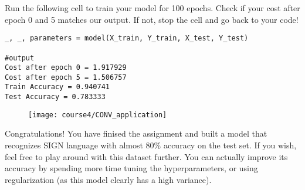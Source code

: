 Run the following cell to train your model for 100 epochs. Check if your cost after epoch 0 and 5 matches our output. If not, stop the cell and go back to your code!

\begin{verbatim}
_, _, parameters = model(X_train, Y_train, X_test, Y_test)

#output
Cost after epoch 0 = 1.917929
Cost after epoch 5 = 1.506757
Train Accuracy = 0.940741
Test Accuracy = 0.783333
\end{verbatim}
\clearpage
\begin{figure}[h]
\begin{center}
\texttt{[image: course4/CONV\_application]}
\end{center}
\end{figure}

Congratulations! You have finised the assignment and built a model that recognizes SIGN language with almost 80\% accuracy on the test set. If you wish, feel free to play around with this dataset further. You can actually improve its accuracy by spending more time tuning the hyperparameters, or using regularization (as this model clearly has a high variance).

\clearpage